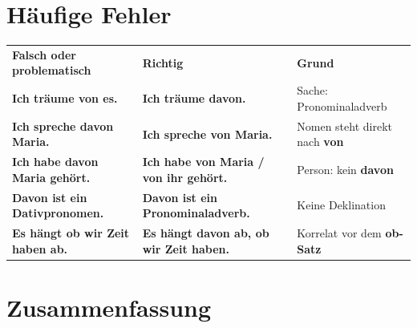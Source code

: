 \documentclass[a4paper,11pt]{article}
\begin{document}
    \section{Häufige Fehler}

        \begin{longtable}{p{5.6cm}|p{5.6cm}|p{3.2cm}}
            \rowcolor{HeaderBlueDark}
            \color{white}\textbf{Falsch oder problematisch} &
            \color{white}\textbf{Richtig} &
            \color{white}\textbf{Grund} \\
            \textbf{Ich träume von es.} & \textbf{Ich träume davon.} & Sache: Pronominaladverb \\
            \textbf{Ich spreche davon Maria.} & \textbf{Ich spreche von Maria.} & Nomen steht direkt nach \textbf{von} \\
            \textbf{Ich habe davon Maria gehört.} & \textbf{Ich habe von Maria / von ihr gehört.} & Person: kein \textbf{davon} \\
            \textbf{Davon ist ein Dativpronomen.} & \textbf{Davon ist ein Pronominaladverb.} & Keine Deklination \\
            \textbf{Es hängt ob wir Zeit haben ab.} & \textbf{Es hängt davon ab, ob wir Zeit haben.} & Korrelat vor dem \textbf{ob-Satz} \\
        \end{longtable}

    \section{Zusammenfassung}
\end{document}
